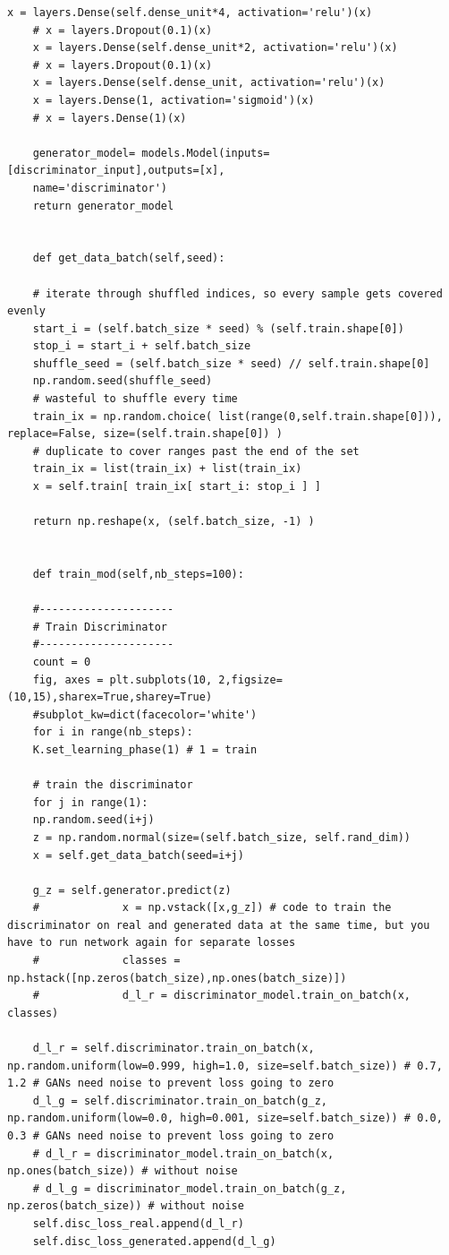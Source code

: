 \begin{lstlisting}[backgroundcolor = \color{white}]
	x = layers.Dense(self.dense_unit*4, activation='relu')(x)
	# x = layers.Dropout(0.1)(x)
	x = layers.Dense(self.dense_unit*2, activation='relu')(x)
	# x = layers.Dropout(0.1)(x)
	x = layers.Dense(self.dense_unit, activation='relu')(x)
	x = layers.Dense(1, activation='sigmoid')(x)
	# x = layers.Dense(1)(x)
	
	generator_model= models.Model(inputs=[discriminator_input],outputs=[x],
	name='discriminator')
	return generator_model
	
	
	def get_data_batch(self,seed):
	
	# iterate through shuffled indices, so every sample gets covered evenly
	start_i = (self.batch_size * seed) % (self.train.shape[0])
	stop_i = start_i + self.batch_size
	shuffle_seed = (self.batch_size * seed) // self.train.shape[0]
	np.random.seed(shuffle_seed)
	# wasteful to shuffle every time
	train_ix = np.random.choice( list(range(0,self.train.shape[0])), replace=False, size=(self.train.shape[0]) ) 
	# duplicate to cover ranges past the end of the set
	train_ix = list(train_ix) + list(train_ix) 
	x = self.train[ train_ix[ start_i: stop_i ] ]
	
	return np.reshape(x, (self.batch_size, -1) )
	
	
	def train_mod(self,nb_steps=100):
	
	#---------------------
	# Train Discriminator
	#---------------------
	count = 0
	fig, axes = plt.subplots(10, 2,figsize=(10,15),sharex=True,sharey=True)
	#subplot_kw=dict(facecolor='white')
	for i in range(nb_steps):
	K.set_learning_phase(1) # 1 = train
	
	# train the discriminator
	for j in range(1):
	np.random.seed(i+j)
	z = np.random.normal(size=(self.batch_size, self.rand_dim))
	x = self.get_data_batch(seed=i+j)
	
	g_z = self.generator.predict(z)
	#             x = np.vstack([x,g_z]) # code to train the discriminator on real and generated data at the same time, but you have to run network again for separate losses
	#             classes = np.hstack([np.zeros(batch_size),np.ones(batch_size)])
	#             d_l_r = discriminator_model.train_on_batch(x, classes)
	
	d_l_r = self.discriminator.train_on_batch(x, np.random.uniform(low=0.999, high=1.0, size=self.batch_size)) # 0.7, 1.2 # GANs need noise to prevent loss going to zero
	d_l_g = self.discriminator.train_on_batch(g_z, np.random.uniform(low=0.0, high=0.001, size=self.batch_size)) # 0.0, 0.3 # GANs need noise to prevent loss going to zero
	# d_l_r = discriminator_model.train_on_batch(x, np.ones(batch_size)) # without noise
	# d_l_g = discriminator_model.train_on_batch(g_z, np.zeros(batch_size)) # without noise
	self.disc_loss_real.append(d_l_r)
	self.disc_loss_generated.append(d_l_g)
	

\end{lstlisting}
